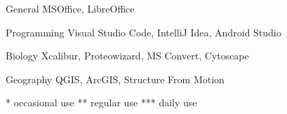

\begin{cvpairs}

  
\cvpair
    {General} %
    {MSOffice, LibreOffice} %

  
\cvpair
    {Programming} %
    {Visual Studio Code, IntelliJ Idea, Android Studio} %

  
\cvpair
    {Biology} %
    {Xcalibur, Proteowizard, MS Convert, Cytoscape} %

  
\cvpair
    {Geography} %
    {QGIS, ArcGIS, Structure From Motion} %

\end{cvpairs}

\bigskip
{\color{red}\footnotesize
* occasional use \quad
** regular use \quad
*** daily use
}